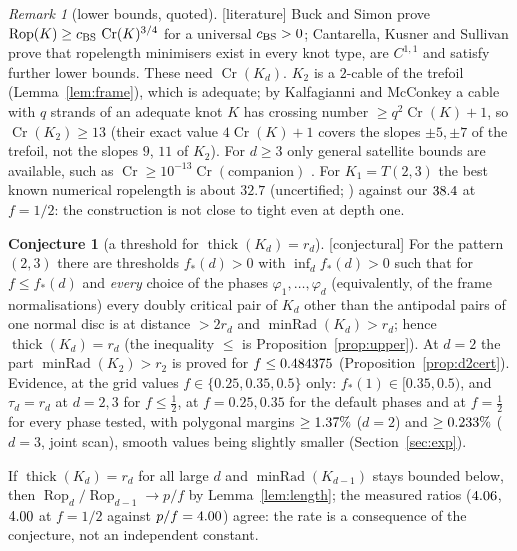 \documentclass[10pt,a4paper]{article}
\theoremstyle{plain}
\theoremstyle{definition}
\newtheorem{conjecture}[theorem]{Conjecture}
\theoremstyle{remark}
\newtheorem{remark}[theorem]{Remark}
\newcommand{\thick}{\operatorname{thick}}
\newcommand{\Rop}{\operatorname{Rop}}
\newcommand{\Cr}{\operatorname{Cr}}
\newcommand{\minRad}{\operatorname{minRad}}
\newcommand{\status}[1]{\textsf{\small [#1]}}
\begin{document}
\begin{remark}[lower bounds, quoted]\label{rem:lower}\status{literature}
Buck and Simon \cite{BuckSimon1999} prove $\Rop(K)\ge c_{\rm BS}\,\Cr(K)^{3/4}$ for a universal $c_{\rm BS}>0$; Cantarella, Kusner and Sullivan \cite{CKS2002} prove that ropelength minimisers exist in every knot type, are $C^{1,1}$ and satisfy further lower bounds. These need $\Cr(K_d)$. $K_2$ is a $2$-cable of the trefoil (Lemma~\ref{lem:frame}), which is adequate; by Kalfagianni and McConkey \cite{KalfagianniMcConkey2024} a cable with $q$ strands of an adequate knot $K$ has crossing number $\ge q^2\Cr(K)+1$, so $\Cr(K_2)\ge13$ (their exact value $4\Cr(K)+1$ covers the slopes $\pm5,\pm7$ of the trefoil, not the slopes $9$, $11$ of $K_2$). For $d\ge3$ only general satellite bounds are available, such as $\Cr\ge10^{-13}\Cr(\text{companion})$ \cite{Lackenby2014}. For $K_1=T(2,3)$ the best known numerical ropelength is about $32.7$ (uncertified; \cite{Pieranski1998,CKS2002}) against our $38.4$ at $f=1/2$: the construction is not close to tight even at depth one.
\end{remark}

\begin{conjecture}[a threshold for $\thick(K_d)=r_d$]\label{conj}\status{conjectural}
For the pattern $(2,3)$ there are thresholds $f_\ast(d)>0$ with $\inf_df_\ast(d)>0$ such that for $f\le f_\ast(d)$ and \emph{every} choice of the phases $\varphi_1,\dots,\varphi_d$ (equivalently, of the frame normalisations) every doubly critical pair of $K_d$ other than the antipodal pairs of one normal disc is at distance $>2r_d$ and $\minRad(K_d)>r_d$; hence $\thick(K_d)=r_d$ (the inequality $\le$ is Proposition~\ref{prop:upper}). At $d=2$ the part $\minRad(K_2)>r_2$ is proved for $f\le0.484375$ (Proposition~\ref{prop:d2cert}). Evidence, at the grid values $f\in\{0.25,0.35,0.5\}$ only: $f_\ast(1)\in[0.35,0.5)$, and $\tau_d=r_d$ at $d=2,3$ for $f\le\frac12$, at $f=0.25,0.35$ for the default phases and at $f=\frac12$ for every phase tested, with polygonal margins $\ge1.37\%$ ($d=2$) and $\ge0.233\%$ ($d=3$, joint scan), smooth values being slightly smaller (Section~\ref{sec:exp}).
\end{conjecture}

\noindent If $\thick(K_d)=r_d$ for all large $d$ and $\minRad(K_{d-1})$ stays bounded below, then $\Rop_d/\Rop_{d-1}\to p/f$ by Lemma~\ref{lem:length}; the measured ratios ($4.06$, $4.00$ at $f=1/2$ against $p/f=4.00$) agree: the rate is a consequence of the conjecture, not an independent constant.
\end{document}
